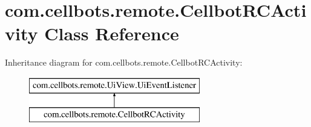 \hypertarget{classcom_1_1cellbots_1_1remote_1_1_cellbot_r_c_activity}{\section{com.\-cellbots.\-remote.\-Cellbot\-R\-C\-Activity Class Reference}
\label{classcom_1_1cellbots_1_1remote_1_1_cellbot_r_c_activity}
}
Inheritance diagram for com.\-cellbots.\-remote.\-Cellbot\-R\-C\-Activity\-:\begin{figure}[H]
\begin{center}
\leavevmode
\includegraphics[height=2.000000cm]{classcom_1_1cellbots_1_1remote_1_1_cellbot_r_c_activity}
\end{center}
\end{figure}
